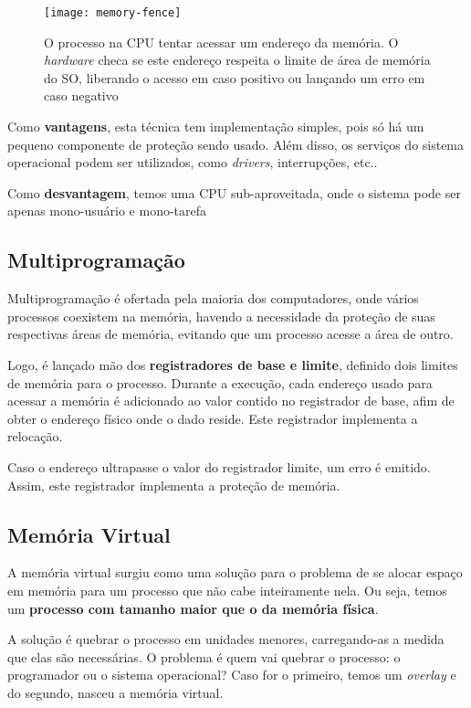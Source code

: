 \begin{figure}
  \centering
  \texttt{[image: memory-fence]}
  \caption{O processo na CPU tentar acessar um endereço da memória. O \textit{hardware} checa se este endereço respeita o limite de área de memória do SO, liberando o acesso em caso positivo ou lançando um erro em caso negativo}
  \label{fig:memory-fence}
\end{figure}

Como \textbf{vantagens}, esta técnica tem implementação simples, pois só há um pequeno componente de proteção sendo usado. Além disso, os serviços do sistema operacional podem ser utilizados, como \textit{drivers}, interrupções, etc..

Como \textbf{desvantagem}, temos uma CPU sub-aproveitada, onde o sistema pode ser apenas mono-usuário e mono-tarefa






\subsection{Multiprogramação}
Multiprogramação é ofertada pela maioria dos computadores, onde vários processos coexistem na memória, havendo a necessidade da proteção de suas respectivas áreas de memória, evitando que um processo acesse a área de outro.

Logo, é lançado mão dos \textbf{registradores de base e limite}, definido dois limites de memória para o processo. Durante a execução, cada endereço usado para acessar a memória é adicionado ao valor contido no registrador de base, afim de obter o endereço físico onde o dado reside. Este registrador implementa a relocação.

Caso o endereço ultrapasse o valor do registrador limite, um erro é emitido. Assim, este registrador implementa a proteção de memória.







\subsection{Memória Virtual}
A memória virtual surgiu como uma solução para o problema de se alocar espaço em memória para um processo que não cabe inteiramente nela. Ou seja, temos um \textbf{processo com tamanho maior que o da memória física}.

A solução é quebrar o processo em unidades menores, carregando-as a medida que elas são necessárias. O problema é quem vai quebrar o processo: o programador ou o sistema operacional? Caso for o primeiro, temos um \textit{overlay} e do segundo, nasceu a memória virtual.


